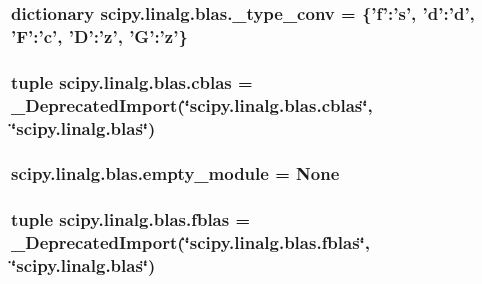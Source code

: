\subsubsection[{\+\_\+type\+\_\+conv}]{\setlength{\rightskip}{0pt plus 5cm}dictionary scipy.\+linalg.\+blas.\+\_\+type\+\_\+conv = \{'f'\+:'{\bf s}', 'd'\+:'d', 'F'\+:'c', '{\bf D}'\+:'z', 'G'\+:'z'\}}\label{namespacescipy_1_1linalg_1_1blas_ab328cec4e8cdff29330faa8f2b135cbe}
\hypertarget{namespacescipy_1_1linalg_1_1blas_a34c674579eda86cd0f9086f41cc0577e}{}
\subsubsection[{cblas}]{\setlength{\rightskip}{0pt plus 5cm}tuple scipy.\+linalg.\+blas.\+cblas = \+\_\+\+Deprecated\+Import(\char`\"{}scipy.\+linalg.\+blas.\+cblas\char`\"{}, \char`\"{}scipy.\+linalg.\+blas\char`\"{})}\label{namespacescipy_1_1linalg_1_1blas_a34c674579eda86cd0f9086f41cc0577e}
\hypertarget{namespacescipy_1_1linalg_1_1blas_af295f7ae5b5c08cff5238042afd70854}{}
\subsubsection[{empty\+\_\+module}]{\setlength{\rightskip}{0pt plus 5cm}scipy.\+linalg.\+blas.\+empty\+\_\+module = None}\label{namespacescipy_1_1linalg_1_1blas_af295f7ae5b5c08cff5238042afd70854}
\hypertarget{namespacescipy_1_1linalg_1_1blas_a4bd01d83ab6c5f6b63727c7d14a86a69}{}
\subsubsection[{fblas}]{\setlength{\rightskip}{0pt plus 5cm}tuple scipy.\+linalg.\+blas.\+fblas = \+\_\+\+Deprecated\+Import(\char`\"{}scipy.\+linalg.\+blas.\+fblas\char`\"{}, \char`\"{}scipy.\+linalg.\+blas\char`\"{})}\label{namespacescipy_1_1linalg_1_1blas_a4bd01d83ab6c5f6b63727c7d14a86a69}
